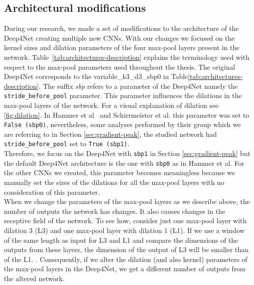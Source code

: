 \subsection{Architectural modifications}\label{subsec:architectural-modifications}
During our research, we made a set of modifications to the architecture of the Deep4Net creating multiple new CNNs.
With our changes we focused on the kernel sizes and dilation parameters of the four max-pool layers present in the network.
Table~\ref{tab:architectures-description} explains the terminology used with respect to the max-pool parameters used throughout the thesis.
The original Deep4Net corresponds to the {variable}\_k3\_d3\_sbp0 in Table\ref{tab:architectures-description}.
The suffix \textit{sbp} refers to a parameter of the Deep4Net namely the \texttt{stride\_before\_pool} parameter.
This parameter influences the dilations in the max-pool layers of the network.
For a visual explanation of dilation see \ref{fig:dilation}.
In Hammer et al~\cite{Hammer-2021} and Schirrmeister et al. \cite{schirrmeister-deep-2017}this parameter was set to \texttt{False (sbp0)}, nevertheless, some analyses performed by their group which we are referring to in Section \cref{sec:gradient-peak}, the studied network had \texttt{stride\_before\_pool} set to \texttt{True (sbp1)}. \\

Therefore, we focus on the Deep4Net with \texttt{sbp1} in Section \ref{sec:gradient-peak} but the default Deep4Net architecture is the one with \texttt{sbp0} as in Hammer et al. For the other CNNs we created, this parameter becomes meaningless because we manually set the sizes of the dilations for all the max-pool layers with no consideration of this parameter. \\



When we change the parameters of the max-pool layers as we describe above, the number of outputs the network has changes.
It also causes changes in the receptive field of the network.
To see how, consider just one max-pool layer with dilation 3 (L3) and one max-pool layer with dilation 1 (L1). 
If we use a window of the same length as input for L3 and L1 and compare the dimensions of the outputs from these layers, the dimension of the output of L3 will be smaller than of the L1.
.
Consequently, if we alter the dilation (and also kernel) parameters of the max-pool layers in the Deep4Net, we get a different number of outputs from the altered network.  \\

